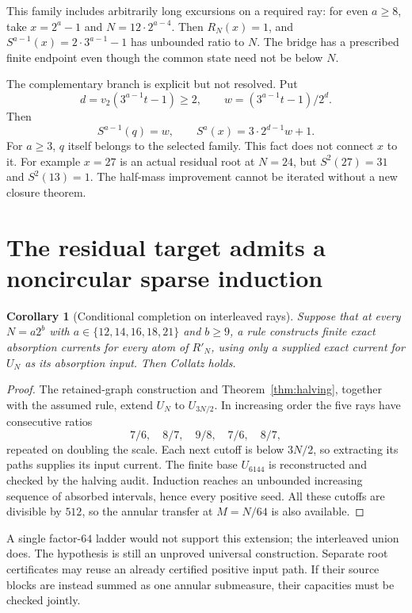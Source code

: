 \documentclass[11pt]{article}
\newtheorem{corollary}[theorem]{Corollary}
\begin{document}
This family includes arbitrarily long excursions on a required ray:
for even $a\ge8$, take $x=2^a-1$ and $N=12\cdot2^{a-4}$.
Then $R_N(x)=1$, and $S^{a-1}(x)=2\cdot3^{a-1}-1$ has
unbounded ratio to $N$. The bridge has a prescribed finite endpoint
even though the common state need not be below $N$.

The complementary branch is explicit but not resolved. Put
\[
d=v_2(3^{a-1}t-1)\ge2,\qquad
w=(3^{a-1}t-1)/2^d.
\]
Then
\[
S^{a-1}(q)=w,\qquad S^a(x)=3\cdot2^{d-1}w+1.
\]
For $a\ge3$, $q$ itself belongs to the selected family. This fact
does not connect $x$ to it. For example $x=27$ is an actual residual
root at $N=24$, but $S^2(27)=31$ and $S^2(13)=1$.
The half-mass improvement cannot be iterated without a new closure theorem.

\section{The residual target admits a noncircular sparse induction}
\begin{corollary}[Conditional completion on interleaved rays]\label{cor:residualrays}
Suppose that at every $N=a2^b$ with
$a\in\{12,14,16,18,21\}$ and $b\ge9$, a rule constructs finite
exact absorption currents for every atom of $R'_N$, using only a
supplied exact current for $U_N$ as its absorption input.
Then Collatz holds.
\end{corollary}
\begin{proof}
The retained-graph construction and Theorem~\ref{thm:halving},
together with the assumed rule, extend $U_N$ to $U_{3N/2}$.
In increasing order the five rays have consecutive ratios
\[
7/6,\quad8/7,\quad9/8,\quad7/6,\quad8/7,
\]
repeated on doubling the scale. Each next cutoff is below $3N/2$,
so extracting its paths supplies its input current. The finite base
$U_{6144}$ is reconstructed and checked by the halving audit.
Induction reaches an unbounded increasing sequence of absorbed
intervals, hence every positive seed. All these cutoffs are divisible
by $512$, so the annular transfer at $M=N/64$ is also available.
\end{proof}
A single factor-$64$ ladder would not support this extension; the
interleaved union does. The hypothesis is still an unproved universal
construction. Separate root certificates may reuse an already
certified positive input path. If their source blocks are instead
summed as one annular submeasure, their capacities must be checked jointly.
\end{document}
